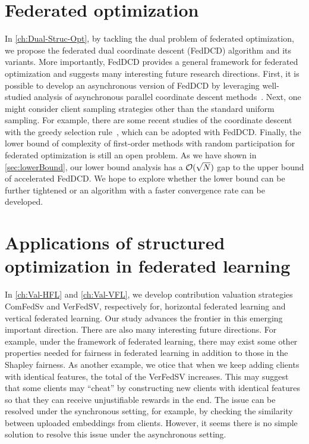 \section{Federated optimization}

In \autoref{ch:Dual-Struc-Opt}, by tackling the dual problem of federated optimization, we propose the federated dual coordinate descent (FedDCD) algorithm and its variants. More importantly, FedDCD provides a general framework for federated optimization and suggests many interesting future research directions. First, it is possible to develop an asynchronous version of FedDCD by leveraging well-studied analysis of asynchronous parallel coordinate descent methods~\citep{LiuW15,0002WRBS15}. Next, one might consider client sampling strategies other than the standard uniform sampling. For example, there are some recent studies of the coordinate descent with the greedy selection rule~\citep{NutiniSLFK15,BCD_julie,fang2020greed}, which can be adopted with FedDCD. Finally, the lower bound of complexity of first-order methods with random participation for federated optimization is still an open problem. As we have shown in \autoref{sec:lowerBound}, our lower bound analysis has a $\mathcal{O}(\sqrt{N})$ gap to the upper bound of accelerated FedDCD. We hope to explore whether the lower bound can be further tightened or an algorithm with a faster convergence rate can be developed. 


\section{Applications of structured optimization in federated learning}

In \autoref{ch:Val-HFL} and \autoref{ch:Val-VFL}, we develop contribution valuation strategies ComFedSv and VerFedSV, respectively for, horizontal federated learning and vertical federated learning.  Our study advances the frontier in this emerging important direction. There are also many interesting future directions. For example, under the framework of federated learning, there may exist some other properties needed for fairness in federated learning in addition to those in the Shapley fairness. As another example, we otice that when we keep adding clients with identical features, the total of the VerFedSV increases. This may suggest that some clients may ``cheat'' by constructing new clients with identical features so that they can receive unjustifiable rewards in the end. The issue can be resolved under the synchronous setting, for example, by checking the similarity between uploaded embeddings from clients. However, it seems there is no simple solution to resolve this issue under the asynchronous setting. 
